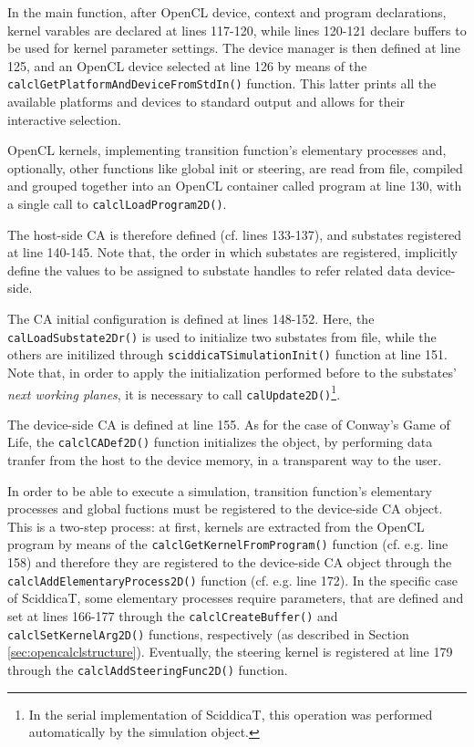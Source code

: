 In the main function, after OpenCL device, context and program
declarations, kernel varables are declared at lines 117-120, while
lines 120-121 declare buffers to be used for kernel parameter
settings.  The device manager is then defined at line 125, and an
OpenCL device selected at line 126 by means of the
\verb'calclGetPlatformAndDeviceFromStdIn()' function.  This latter
prints all the available platforms and devices to standard output and
allows for their interactive selection.

OpenCL kernels, implementing transition function's elementary
processes and, optionally, other functions like global init or
steering, are read from file, compiled and grouped together into an
OpenCL container called program at line 130, with a single call to
\verb'calclLoadProgram2D()'.

The host-side CA is therefore defined (cf. lines 133-137), and
substates registered at line 140-145. Note that, the order in which
substates are registered, implicitly define the values to be assigned
to substate handles to refer related data device-side.

The CA initial configuration is defined at lines 148-152. Here, the
\verb'calLoadSubstate2Dr()' is used to initialize two substates from
file, while the others are initilized through
\verb'sciddicaTSimulationInit()' function at line 151. Note that, in
order to apply the initialization performed before to the substates'
\emph{next working planes}, it is necessary to call
\verb'calUpdate2D()'\footnote{In the serial implementation of
  SciddicaT, this operation was performed automatically by the
  simulation object.}.

The device-side CA is defined at line 155. As for the case of Conway's
Game of Life, the \verb'calclCADef2D()' function initializes the
object, by performing data tranfer from the host to the device memory,
in a transparent way to the user.

In order to be able to execute a simulation, transition function's
elementary processes and global fuctions must be registered to the
device-side CA object. This is a two-step process: at first, kernels
are extracted from the OpenCL program by means of the
\verb'calclGetKernelFromProgram()' function (cf. e.g. line 158) and
therefore they are registered to the device-side CA object through the
\verb'calclAddElementaryProcess2D()' function (cf. e.g. line 172). In
the specific case of SciddicaT, some elementary processes require
parameters, that are defined and set at lines 166-177 through the
\verb'calclCreateBuffer()' and \verb'calclSetKernelArg2D()' functions,
respectively (as described in Section
\ref{sec:opencalclstructure}). Eventually, the steering kernel is
registered at line 179 through the \verb'calclAddSteeringFunc2D()'
function.

